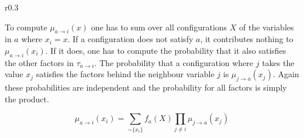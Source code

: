 \begin{wrapfigure}{r}{0.3\textwidth}

\end{wrapfigure}

To compute $\mu_{a \rightarrow i}(x)$ one has to sum over all configurations $X$ of the variables in $a$ where $x_i = x$. If a configuration does not satisfy $a$, it contributes nothing to $\mu_{a \rightarrow i}(x_i)$. If it does, one has to compute the probability that it also satisfies the other factors in $\tau_{a \rightarrow i}$. The probability that a configuration where $j$ takes the value $x_j$ satisfies the factors behind the neighbour variable $j$ is $\mu_{j \rightarrow a}(x_j)$. Again these probabilities are independent and the probability for all factors is simply the product.

$$\mu_{a \rightarrow i}(x_i) = \sum_{ \sim \{x_i\}} f_a(X) \prod_{j \neq i} \mu_{j \rightarrow a}(x_j)$$

